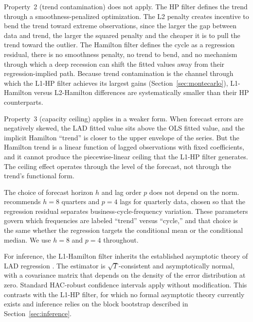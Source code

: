 \documentclass[10pt]{article}
\begin{document}
Property~2 (trend contamination) does not apply. The HP filter defines the trend through a smoothness-penalized optimization. The L2 penalty creates incentive to bend the trend toward extreme observations, since the larger the gap between data and trend, the larger the squared penalty and the cheaper it is to pull the trend toward the outlier. The Hamilton filter defines the cycle as a regression residual, there is no smoothness penalty, no trend to bend, and no mechanism through which a deep recession can shift the fitted values away from their regression-implied path. Because trend contamination is the channel through which the L1-HP filter achieves its largest gains (Section~\ref{sec:montecarlo}), L1-Hamilton versus L2-Hamilton differences are systematically smaller than their HP counterparts.

Property~3 (capacity ceiling) applies in a weaker form. When forecast errors are negatively skewed, the LAD fitted value sits above the OLS fitted value, and the implicit Hamilton ``trend'' is closer to the upper envelope of the series. But the Hamilton trend is a linear function of lagged observations with fixed coefficients, and it cannot produce the piecewise-linear ceiling that the L1-HP filter generates. The ceiling effect operates through the level of the forecast, not through the trend's functional form.

The choice of forecast horizon $h$ and lag order $p$ does not depend on the norm. \citet{hamilton2018} recommends $h = 8$ quarters and $p = 4$ lags for quarterly data, chosen so that the regression residual separates business-cycle-frequency variation. These parameters govern which frequencies are labeled ``trend'' versus ``cycle,'' and that choice is the same whether the regression targets the conditional mean or the conditional median. We use $h = 8$ and $p = 4$ throughout.

For inference, the L1-Hamilton filter inherits the established asymptotic theory of LAD regression \citep{koenker2005}. The estimator is $\sqrt{T}$-consistent and asymptotically normal, with a covariance matrix that depends on the density of the error distribution at zero. Standard HAC-robust confidence intervals apply without modification. This contrasts with the L1-HP filter, for which no formal asymptotic theory currently exists and inference relies on the block bootstrap described in Section~\ref{sec:inference}.
\end{document}
